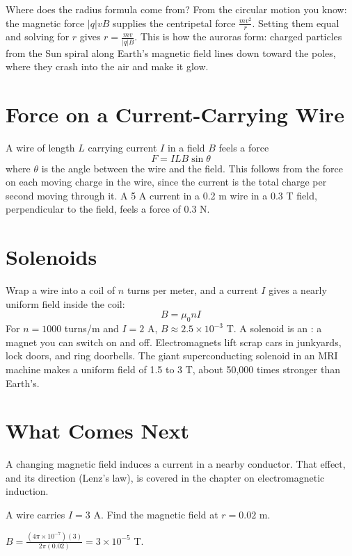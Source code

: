 Where does the radius formula come from? From the circular motion you
know: the magnetic force $|q|vB$ supplies the centripetal force
$\frac{mv^2}{r}$. Setting them equal and solving for $r$ gives
$r = \frac{mv}{|q|B}$. This is how the auroras form: charged particles from
the Sun spiral along Earth's magnetic field lines down toward the poles,
where they crash into the air and make it glow.

\section{Force on a Current-Carrying Wire}
A wire of length $L$ carrying current $I$ in a field $B$ feels a force
$$F = ILB\sin\theta$$
where $\theta$ is the angle between the wire and the field. This follows from the force on each moving charge in the wire, since the current is
the total charge per second moving through it. A 5 A current in a 0.2 m wire in a 0.3 T field, perpendicular to the field, feels a force of $0.3$ N.

\section{Solenoids}
Wrap a wire into a coil of $n$ turns per meter, and a current $I$ gives a nearly uniform field inside the coil:
$$B = \mu_0 n I$$
For $n = 1000$ turns/m and $I = 2$ A, $B \approx 2.5 \times 10^{-3}$ T. A solenoid is an : a magnet you can switch on and
off. Electromagnets lift scrap cars in junkyards, lock doors, and ring
doorbells. The giant superconducting solenoid in an MRI machine makes a
uniform field of 1.5 to 3 T, about 50,000 times stronger than Earth's.

\section{What Comes Next}
A changing magnetic field induces a current in a nearby conductor. That effect, and its direction (Lenz's law), is covered in the chapter on electromagnetic induction.

\begin{Exercise}[label=mag1, title=Field of a wire]
A wire carries $I = 3$ A. Find the magnetic field at $r = 0.02$ m.
\end{Exercise}
\begin{Answer}[ref=mag1]
$B = \frac{(4\pi \times 10^{-7})(3)}{2\pi(0.02)} = 3 \times 10^{-5}$ T.
\end{Answer}

